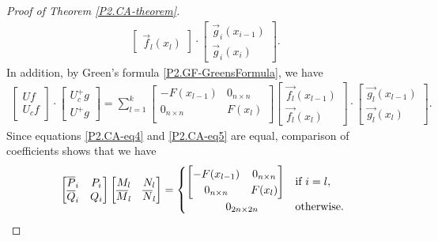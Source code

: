\documentclass[10pt,reqno,oneside,a4paper]{article}
\begin{document}
\begin{proof}[Proof of Theorem \ref{P2.CA-theorem}]
\begin{align}
\begin{bmatrix}
\vec{f}_l(x_l) 
\end{bmatrix} 
\cdot 
\begin{bmatrix}
\vec{g}_i(x_{i-1}) \\
\vec{g}_i(x_i) 
\end{bmatrix}. \label{P2.CA-eq4}
\end{align}
In addition, by Green's formula \eqref{P2.GF-GreensFormula}, we have
\begin{align}
\begin{bmatrix}
Uf \\
U_c f
\end{bmatrix} \cdot 
\begin{bmatrix}
U^+_cg \\
U^+ g
\end{bmatrix} 
=
\sum^k_{l=1} 
 \begin{bmatrix}
- F(x_{l-1}) & 0_{n\times n} \\
0_{n\times n} &  F(x_{l}) \\
\end{bmatrix}
\begin{bmatrix}
\vec{f_l}(x_{l-1})  \\
\vec{f_l}(x_{l}) 
\end{bmatrix}
\cdot
\begin{bmatrix}
\vec{g_l}(x_{l-1})  \\
\vec{g_l}(x_{l}) 
\end{bmatrix}. \label{P2.CA-eq5}
\end{align}
Since equations \eqref{P2.CA-eq4} and \eqref{P2.CA-eq5} are equal, comparison of coefficients shows that we have 
\begin{align*}
\begin{bmatrix}
\overline{P}_i & P_i \\
\overline{Q}_i & Q_i
\end{bmatrix} 
\begin{bmatrix}
M_l & N_l  \\
\overline{M}_l & \overline{N}_l 
\end{bmatrix}  = \begin{cases}  \begin{bmatrix}
- F(x_{l-1}) & 0_{n\times n} \\
0_{n\times n} &  F(x_{l}) \\
\end{bmatrix}  & \text{if } i = l, \\ \hspace{1.25cm} 0_{2n\times 2n} & \text{otherwise. }\end{cases}

\end{align*}
\end{proof}
\end{document}
